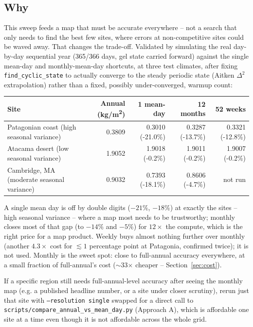 \documentclass[11pt]{article}
\begin{document}
\subsection{Why}
This sweep feeds a map that must be accurate everywhere -- not a search that only needs to find
the best few sites, where errors at non-competitive sites could be waved away. That changes the
trade-off. Validated by simulating the real day-by-day sequential year (365/366 days, gel state
carried forward) against the single mean-day and monthly-mean-day shortcuts, at three test
climates, after fixing \texttt{find\_cyclic\_state} to actually converge to the steady periodic
state (Aitken $\Delta^2$ extrapolation) rather than a fixed, possibly under-converged, warmup
count:

\begin{table}[h]
\centering
\small
\begin{tabular}{@{}lrrrr@{}}
\toprule
\textbf{Site} & \textbf{Annual (kg/m\textsuperscript{2})} & \textbf{1 mean-day} & \textbf{12 months} & \textbf{52 weeks} \\
\midrule
Patagonian coast (high seasonal variance) & 0.3809 & 0.3010 (-21.0\%) & 0.3287 (-13.7\%) & 0.3321 (-12.8\%) \\
Atacama desert (low seasonal variance) & 1.9052 & 1.9018 (-0.2\%) & 1.9011 (-0.2\%) & 1.9007 (-0.2\%) \\
Cambridge, MA (moderate seasonal variance) & 0.9032 & 0.7393 (-18.1\%) & 0.8606 (-4.7\%) & not run \\
\bottomrule
\end{tabular}
\end{table}

A single mean day is off by double digits ($-21\%$, $-18\%$) at exactly the sites -- high
seasonal variance -- where a map most needs to be trustworthy; monthly closes most of that gap
(to $-14\%$ and $-5\%$) for $12\times$ the compute, which is the right price for a map product.
Weekly buys almost nothing further over monthly (another $4.3\times$ cost for $\lesssim 1$
percentage point at Patagonia, confirmed twice); it is not used. Monthly is the sweet spot:
close to full-annual accuracy everywhere, at a small fraction of full-annual's cost
($\sim$33$\times$ cheaper -- Section~\ref{sec:cost}).

If a specific region still needs full-annual-level accuracy after seeing the monthly map (e.g. a
published headline number, or a site under closer scrutiny), rerun just that site with
\texttt{--resolution single} swapped for a direct call to
\texttt{scripts/compare\_annual\_vs\_mean\_day.py} (Approach A), which is affordable one site at a
time even though it is not affordable across the whole grid.
\end{document}
